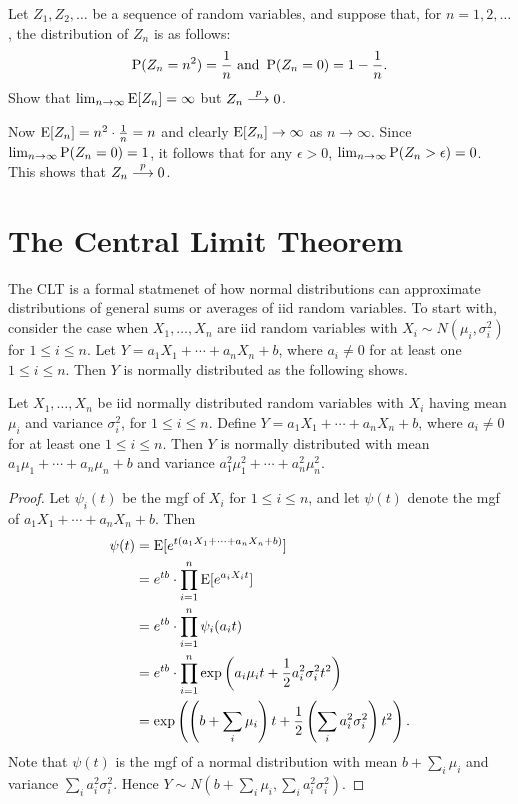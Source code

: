 \begin{example}
Let $Z_1, Z_2, \ldots$ be a sequence of random variables, and suppose that,
for $n = 1, 2, \ldots$, the distribution of $Z_n$ is as follows:
\[
    \operatorname{P} (Z_n = n^2) = \frac{1}{n} \text{ and } \operatorname{P} (Z_n = 0) = 1 - \frac{1}{n}.
\] 
Show that $\lim_{n \to \infty} \operatorname{E} [Z_n] = \infty$ but $Z_n \stackrel{p}{\longrightarrow} 0$.
\begin{solution}
Now $\operatorname{E} [Z_n] = n^2 \cdot \frac{1}{n} = n$ and clearly $\operatorname{E} [Z_n] \to \infty$
as $n \to \infty$. Since $\lim_{n \to \infty} \operatorname{P} (Z_n = 0) = 1$, it follows 
that for any $\epsilon > 0$, $\lim_{n \to \infty} \operatorname{P} (Z_n > \epsilon) = 0$. 
This shows that $Z_n \stackrel{p}{\longrightarrow} 0$.
\end{solution}
\end{example}

\section{The Central Limit Theorem}

The CLT is a formal statmenet of how normal distributions can approximate 
distributions of general sums or averages of iid random variables. To start with,
consider the case when $X_1, \ldots, X_n$ are iid random variables with 
$X_i \sim N(\mu_i, \sigma_i^2)$ for $1 \leq i \leq n$. Let $Y = a_1 X_1 + \cdots 
+ a_n X_n + b$, where $a_i \neq 0$ for at least one $1 \leq i \leq n$. Then $Y$ is 
normally distributed as the following shows.

\begin{theorem}
Let $X_1, \ldots, X_n$ be iid normally distributed random variables with $X_i$ 
having mean $\mu_i$ and variance $\sigma_i^2$, for $1 \leq i \leq n$. Define 
$Y = a_1 X_1 + \cdots + a_n X_n + b$, where $a_i \neq 0$ for at least 
one $1 \leq i \leq n$. Then $Y$ is normally distributed with mean 
$a_1 \mu_1 + \cdots + a_n \mu_n + b$ and variance 
$a_1^2 \mu_1^2 + \cdots + a_n^2 \mu_n^2$.  
\end{theorem}
\begin{proof}
Let $\psi_i (t)$ be the mgf of $X_i$ for $1 \leq i \leq n$, and let 
$\psi (t)$ denote the mgf of $a_1 X_1 + \cdots + a_n X_n + b$. Then 
\begin{align*}
	\psi (t) & = \operatorname{E} [ e^{t (a_1 X_1 + \cdots + a_n X_n + b)}] \\
			 & = e^{t b} \cdot \prod_{i = 1}^{n} \operatorname{E} [e^{a_i X_i t}] \\
			 & = e^{t b} \cdot \prod_{i = 1}^{n} \psi_i (a_i t) \\ 
			 & = e^{t b} \cdot \prod_{i = 1}^{n} 
			 		\exp \left ( a_i \mu_i t + \frac{1}{2} a_i^2 \sigma_i^2 t^2 
			 		     \right ) \\
			 & = \exp \left ( \left ( b + \sum_i \mu_i \right ) t + 
							  \frac{1}{2} \left ( \sum_i a_i^2 \sigma_i^2 \right ) t^2 
					  \right ). 
\end{align*}
Note that $\psi (t)$ is the mgf of a normal distribution with mean $b + \sum_i \mu_i$
and variance $\sum_i a_i^2 \sigma_i^2$. Hence 
$Y \sim N(b + \sum_i \mu_i, \sum_i a_i^2 \sigma_i^2)$.
\end{proof}

